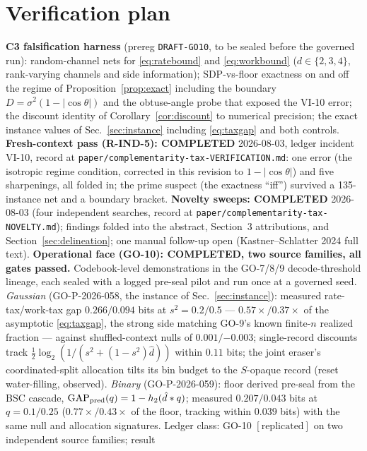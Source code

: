 \documentclass[11pt]{article}
\begin{document}
\section{Verification plan}\label{sec:verify}
\textbf{C3 falsification harness} (prereg \texttt{DRAFT-GO10}, to be sealed
before the governed run): random-channel nets for
\eqref{eq:ratebound} and \eqref{eq:workbound} ($d\in\{2,3,4\}$, rank-varying
channels and side information); SDP-vs-floor exactness on and off the regime
of Proposition~\ref{prop:exact} including the boundary
$D=\sigma^2(1-\lvert\cos\theta\rvert)$ and the obtuse-angle probe that
exposed the VI-10 error; the discount identity of
Corollary~\ref{cor:discount} to numerical precision; the exact instance
values of Sec.~\ref{sec:instance} including \eqref{eq:taxgap} and both
controls. \textbf{Fresh-context pass (R-IND-5): COMPLETED} 2026-08-03,
ledger incident VI-10, record at
\texttt{paper/complementarity-tax-VERIFICATION.md}: one error (the
isotropic regime condition, corrected in this revision to
$1-\lvert\cos\theta\rvert$) and five sharpenings, all folded in; the prime
suspect (the exactness ``iff'') survived a 135-instance net and a boundary
bracket. \textbf{Novelty sweeps: COMPLETED} 2026-08-03 (four independent
searches, record at \texttt{paper/complementarity-tax-NOVELTY.md});
findings folded into the abstract, Section~3 attributions, and
Section~\ref{sec:delineation}; one manual follow-up open
(Kastner--Schlatter 2024 full text).
\textbf{Operational face (GO-10): COMPLETED, two source families, all gates
passed.} Codebook-level demonstrations in the GO-7/8/9 decode-threshold
lineage, each sealed with a logged pre-seal pilot and run once at a governed
seed. \emph{Gaussian} (GO-P-2026-058, the instance of
Sec.~\ref{sec:instance}): measured rate-tax/work-tax gap $0.266/0.094$
bits at $s^2=0.2/0.5$ --- $0.57\times/0.37\times$ of the asymptotic
\eqref{eq:taxgap}, the strong side matching GO-9's known finite-$n$
realized fraction --- against shuffled-context nulls of
$0.001/{-0.003}$; single-record discounts track
$\tfrac12\log_2(1/(s^2+(1-s^2)\hat d))$ within $0.11$ bits; the joint
eraser's coordinated-split allocation tilts its bin budget to the
$S$-opaque record (reset water-filling, observed). \emph{Binary}
(GO-P-2026-059): floor derived pre-seal from the BSC cascade,
$\mathrm{GAP}_{\rm pred}(q)=1-h_2(\hat d * q)$; measured $0.207/0.043$ bits
at $q=0.1/0.25$ ($0.77\times/0.43\times$ of the floor, tracking within
$0.039$ bits) with the same null and allocation signatures. Ledger class:
GO-10 $[\mathrm{replicated}]$ on two independent source families; result
\end{document}
